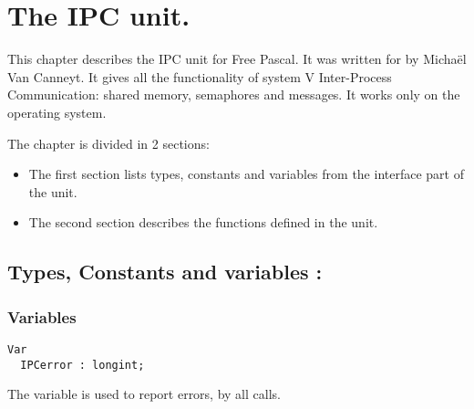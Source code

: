 %
%
%
%
%
\chapter{The IPC unit.}
\label{ch:ipcunit}

This chapter describes the IPC unit for Free Pascal. It was written for
\linux by Micha\"el Van Canneyt. It gives all the functionality of system V 
Inter-Process Communication: shared memory, semaphores and messages.
It works only on the \linux operating system.

The chapter is divided in 2 sections:
\begin{itemize}
\item The first section lists types, constants and variables from the
interface part of the unit.
\item The second section describes the functions defined in the unit.
\end{itemize}
\section {Types, Constants and variables : }
\subsection{Variables}

\begin{verbatim}
Var
  IPCerror : longint;
\end{verbatim}
The  variable is used to report errors, by all calls.
